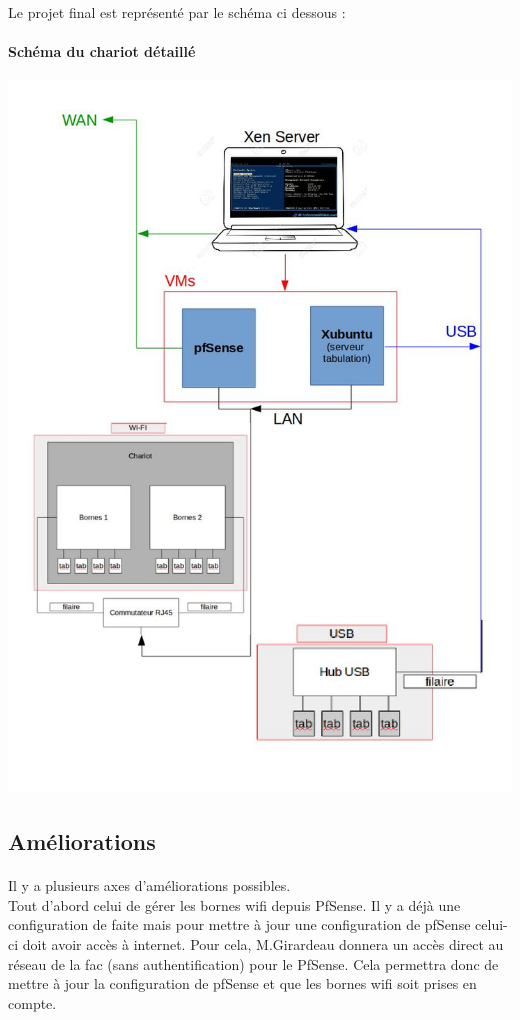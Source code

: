 \documentclass[a4paper,12pt]{extarticle}
\begin{document}
Le projet final est représenté par le schéma ci dessous :

\clearpage
\paragraph{Schéma du chariot détaillé}
\begin{center}
\includegraphics[scale=0.65]{chariot}\\
\end{center}

\subsection{Améliorations}

\paragraph{}
Il y a plusieurs axes d’améliorations possibles. \\
Tout d’abord celui de gérer les bornes wifi depuis PfSense. Il y a déjà une configuration de faite mais pour mettre à jour une configuration de pfSense celui-ci doit avoir accès à internet. Pour cela, M.Girardeau donnera un accès direct au réseau de la fac (sans authentification) pour le PfSense. Cela permettra donc de mettre à jour la configuration de pfSense et que les bornes wifi soit prises en compte.\\ 
\end{document}

